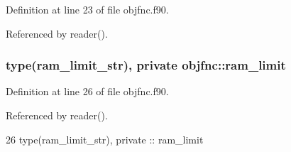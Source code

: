 Definition at line 23 of file objfnc.\+f90.



Referenced by reader().

\subsubsection[{ram\+\_\+limit}]{\setlength{\rightskip}{0pt plus 5cm}type({\bf ram\+\_\+limit\+\_\+str}), private objfnc\+::ram\+\_\+limit\hspace{0.3cm}{\ttfamily [private]}}\label{namespaceobjfnc_a7d3ea4fe32ff44c9a2e6884f7ae27259}


Definition at line 26 of file objfnc.\+f90.



Referenced by reader().


\begin{DoxyCode}
26   \textcolor{keywordtype}{type}(ram\_limit\_str), \textcolor{keywordtype}{private} :: ram\_limit
\end{DoxyCode}

